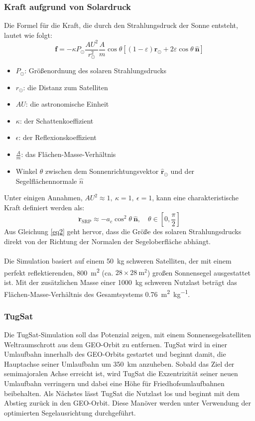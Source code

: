 \documentclass{article}
\begin{document}
\subsubsection{Kraft aufgrund von Solardruck}
Die Formel für die Kraft, die durch den Strahlungsdruck der Sonne entsteht, lautet wie folgt:
\begin{equation}
	\boldsymbol{f}=-\kappa P_{\odot} \frac{A U^2}{r_{\odot}^2} \frac{A}{m} \cos \theta\left[(1-\varepsilon) \hat{\boldsymbol{r}}_{\odot}+2 \varepsilon \cos \theta ~\widehat{\boldsymbol{n}}\right]
\end{equation}
\begin{itemize}
	\item $P_{\odot}$: Größenordnung des solaren Strahlungsdrucks
	\item $r_{\odot}$: die Distanz zum Satelliten
	\item $AU$: die astronomische Einheit
	\item $\kappa$: der Schattenkoeffizient
	\item $\epsilon$: der Reflexionskoeffizient
	\item $\frac{A}{m}$: das Flächen-Masse-Verhältnis
	\item Winkel $\theta$ zwischen dem Sonnenrichtungsvektor $\hat{\boldsymbol{r}}_{\odot}$ und der Segelflächennormale $\widehat{n}$
\end{itemize}
Unter einigen Annahmen, ${AU}^2\approx1,~\kappa=1,~\epsilon=1$, kann eine charakteristische Kraft definiert werden als:
\begin{equation}
	\ddot{\boldsymbol{r}}_{\mathrm{SRP}} \approx-a_c \cos ^2 \theta ~\hat{\boldsymbol{n}}, \quad \theta \in\left[0, \frac{\pi}{2}\right]
	\label{SRP}
\end{equation}
Aus Gleichung \autoref{eq2} geht hervor, dass die Größe des solaren Strahlungsdrucks direkt von der Richtung der Normalen der Segeloberfläche abhängt. \\\\
Die Simulation basiert auf einem \SI{50}{\kilogram} schweren Satelliten, der mit einem perfekt reflektierenden, \SI{800}{\square \meter} (ca. $28 \times \SI{28}{\square \meter}$) großen Sonnensegel ausgestattet ist. Mit der zusätzlichen Masse einer \SI{1000}{\kilogram} schweren Nutzlast beträgt das Flächen-Masse-Verhältnis des Gesamtsystems \SI{0.76}{\square \meter \per \kilogram}.

\subsubsection{TugSat}
Die TugSat-Simulation soll das Potenzial zeigen, mit einem Sonnensegelsatelliten Weltraumschrott aus dem GEO-Orbit zu entfernen. TugSat wird in einer  Umlaufbahn innerhalb des GEO-Orbits gestartet und beginnt damit, die Hauptachse seiner Umlaufbahn um \SI{350}{\kilo\meter} anzuheben. Sobald das Ziel der semimajoralen Achse erreicht ist, wird TugSat die Exzentrizität seiner neuen Umlaufbahn verringern und dabei eine Höhe für Friedhofsumlaufbahnen beibehalten. Als Nächstes lässt TugSat die Nutzlast los und beginnt mit dem Abstieg zurück in den GEO-Orbit.
Diese Manöver werden unter Verwendung der optimierten Segelausrichtung durchgeführt.
\end{document}
